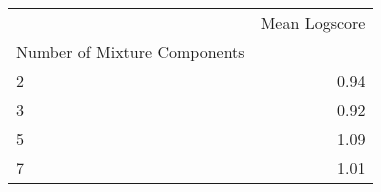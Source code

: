 \begin{tabular}{lr}
\toprule
 & Mean Logscore \\
Number of Mixture Components &  \\
\midrule
2 & 0.94 \\
3 & 0.92 \\
5 & 1.09 \\
7 & 1.01 \\
\bottomrule
\end{tabular}
